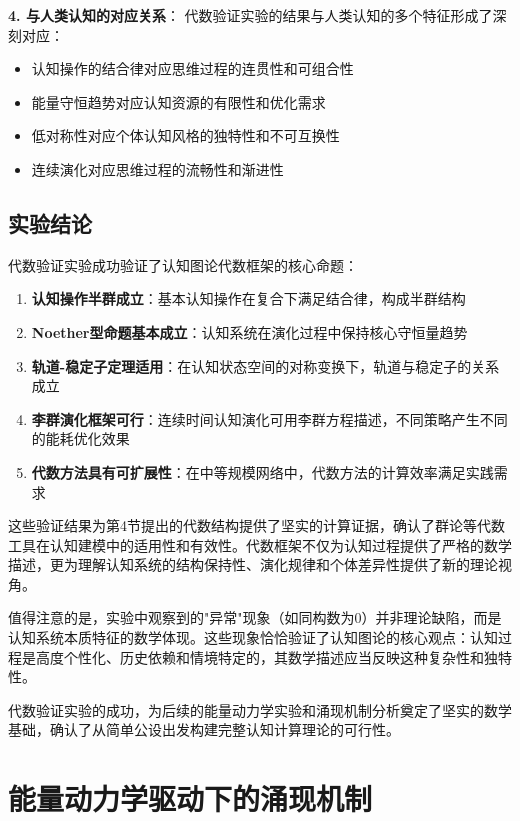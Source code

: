 \documentclass[12pt,a4paper]{article}
\begin{document}
\textbf{4. 与人类认知的对应关系}：
代数验证实验的结果与人类认知的多个特征形成了深刻对应：
\begin{itemize}
    \item 认知操作的结合律对应思维过程的连贯性和可组合性
    \item 能量守恒趋势对应认知资源的有限性和优化需求
    \item 低对称性对应个体认知风格的独特性和不可互换性
    \item 连续演化对应思维过程的流畅性和渐进性
\end{itemize}

\subsection{实验结论}
\label{subsec:algebraic_conclusion}

代数验证实验成功验证了认知图论代数框架的核心命题：

\begin{enumerate}
    \item \textbf{认知操作半群成立}：基本认知操作在复合下满足结合律，构成半群结构
    \item \textbf{Noether型命题基本成立}：认知系统在演化过程中保持核心守恒量趋势
    \item \textbf{轨道-稳定子定理适用}：在认知状态空间的对称变换下，轨道与稳定子的关系成立
    \item \textbf{李群演化框架可行}：连续时间认知演化可用李群方程描述，不同策略产生不同的能耗优化效果
    \item \textbf{代数方法具有可扩展性}：在中等规模网络中，代数方法的计算效率满足实践需求
\end{enumerate}

这些验证结果为第4节提出的代数结构提供了坚实的计算证据，确认了群论等代数工具在认知建模中的适用性和有效性。代数框架不仅为认知过程提供了严格的数学描述，更为理解认知系统的结构保持性、演化规律和个体差异性提供了新的理论视角。

值得注意的是，实验中观察到的"异常"现象（如同构数为0）并非理论缺陷，而是认知系统本质特征的数学体现。这些现象恰恰验证了认知图论的核心观点：认知过程是高度个性化、历史依赖和情境特定的，其数学描述应当反映这种复杂性和独特性。

代数验证实验的成功，为后续的能量动力学实验和涌现机制分析奠定了坚实的数学基础，确认了从简单公设出发构建完整认知计算理论的可行性。


\section{能量动力学驱动下的涌现机制}
\end{document}
